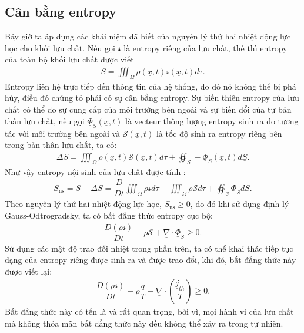 \documentclass[../../../main.tex]{subfiles}
\begin{document}
\subsection{Cân bằng entropy}
    Bây giờ ta áp dụng các khái niệm đã biết của nguyên lý thứ hai nhiệt động lực học cho khối lưu chất. Nếu gọi $\mathcal{s}$ là entropy riêng của lưu chất, thế thì entropy của toàn bộ khối lưu chất được viết 
        \begin{align}
            S=\iiint_{\Omega}\rho\left(\underline{x},t\right)\mathcal{s}\left(\underline{x},t\right)d\tau.
        \end{align}
    Entropy liên hệ trực tiếp đến thông tin của hệ thống, do đó nó không thể bị phá hủy, điều đó chứng tỏ phải có sự cân bằng entropy. Sự biến thiên entropy của lưu chất có thể do sự cung cấp của môi trường bên ngoài và sự biến đổi của tự bản thân lưu chất, nếu gọi $\underline{\Phi}_S\left(\underline{x},t\right)$ là vecteur thông lượng entropy sinh ra do tương tác với môi trường bên ngoài và $\mathscr{S}\left(\underline{x},t\right)$ là tốc độ sinh ra entropy riêng bên trong bản thân lưu chất, ta có:
    \begin{align}
        \Delta S=\iiint_{\Omega}\rho\left(\underline{x},t\right)\mathscr{S}\left(\underline{x},t\right)d\tau+\oiint_\mathscr{S}-\underline{\Phi}_S\left(\underline{x},t\right)d\underline{S}.
    \end{align}
    Như vậy entropy nội sinh của lưu chất được tính :
    \begin{align}
        S_{\text{ns}}=\dot{S}-\Delta S=\dfrac{D}{Dt}\iiint_{\Omega} \rho\mathcal{s}d\tau-\iiint_{\Omega}\rho \mathscr{S}d\tau+\oiint_\mathscr{S}\underline{\Phi}_Sd\underline{S}.
        \end{align}
    Theo nguyên lý thứ hai nhiệt động lực học, $\boxed{S_{\text{ns}}\ge0}$, do đó khi sử dụng định lý Gauss-Odtrogradsky, ta có bất đẳng thức entropy cục bộ:
        \begin{align}
            \dfrac{D(\rho\mathcal{s})}{Dt}-\rho\mathscr{S}+\underline{\nabla}\cdot\underline{\Phi}_S\ge 0.
        \end{align}
    Sử dụng các mật độ trao đổi nhiệt trong phần trên, ta có thể khai thác tiếp tục dạng của entropy riêng được sinh ra và được trao đổi, khi đó, bất đẳng thức này được viết lại:
        \begin{align}
            \boxed{
                \dfrac{D(\rho\mathcal{s})}{Dt}-\rho\dfrac{q}{T}+\underline{\nabla}\cdot\left(\dfrac{\underline{j}_{th}}{T}\right)\ge0}.
        \end{align}
    Bất đẳng thức này có tến là  và rất quan trọng, bởi vì, mọi hành vi của lưu chất mà không thỏa mãn bất đẳng thức này đều không thể xảy ra trong tự nhiên.
\end{document}
